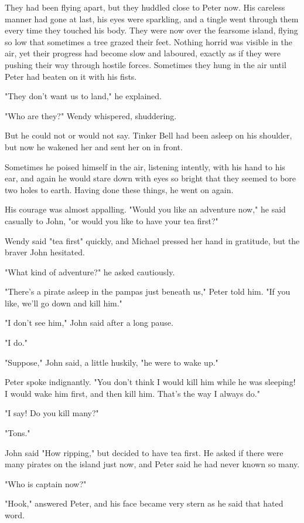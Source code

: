 They had been flying apart, but they huddled close to Peter now. His
careless manner had gone at last, his eyes were sparkling, and a tingle
went through them every time they touched his body. They were now over the
fearsome island, flying so low that sometimes a tree grazed their feet.
Nothing horrid was visible in the air, yet their progress had become slow
and laboured, exactly as if they were pushing their way through hostile
forces. Sometimes they hung in the air until Peter had beaten on it with
his fists.


"They don't want us to land," he explained.


"Who are they?" Wendy whispered, shuddering.


But he could not or would not say. Tinker Bell had been asleep on his
shoulder, but now he wakened her and sent her on in front.


Sometimes he poised himself in the air, listening intently, with his hand
to his ear, and again he would stare down with eyes so bright that they
seemed to bore two holes to earth. Having done these things, he went on
again.


His courage was almost appalling. "Would you like an adventure now," he
said casually to John, "or would you like to have your tea first?"


Wendy said "tea first" quickly, and Michael pressed her hand in gratitude,
but the braver John hesitated.


"What kind of adventure?" he asked cautiously.


"There's a pirate asleep in the pampas just beneath us," Peter told him.
"If you like, we'll go down and kill him."


"I don't see him," John said after a long pause.


"I do."


"Suppose," John said, a little huskily, "he were to wake up."


Peter spoke indignantly. "You don't think I would kill him while he was
sleeping! I would wake him first, and then kill him. That's the way I
always do."


"I say! Do you kill many?"


"Tons."


John said "How ripping," but decided to have tea first. He asked if there
were many pirates on the island just now, and Peter said he had never
known so many.


"Who is captain now?"


"Hook," answered Peter, and his face became very stern as he said that
hated word.


